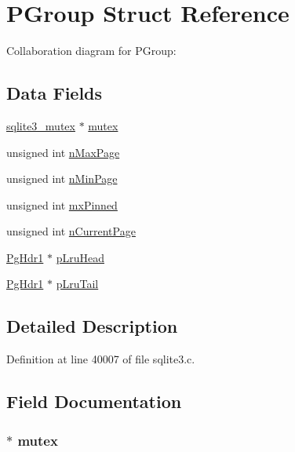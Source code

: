 \hypertarget{struct_p_group}{}\section{P\+Group Struct Reference}
\label{struct_p_group}


Collaboration diagram for P\+Group\+:
\subsection*{Data Fields}
\begin{DoxyCompactItemize}
\item 
\hyperlink{structsqlite3__mutex}{sqlite3\+\_\+mutex} $\ast$ \hyperlink{struct_p_group_a7bcdded0e06fa908fe1a6df19c3dda21}{mutex}
\item 
unsigned int \hyperlink{struct_p_group_ac568a58f73a459ed4cce98f058f91468}{n\+Max\+Page}
\item 
unsigned int \hyperlink{struct_p_group_a2c4b1aa5fcf28d3bf880b8bd5eac95c4}{n\+Min\+Page}
\item 
unsigned int \hyperlink{struct_p_group_a8c213ece02546a2177eb8f35830605e8}{mx\+Pinned}
\item 
unsigned int \hyperlink{struct_p_group_ac067428645a5c7caf1f90b61438fcaac}{n\+Current\+Page}
\item 
\hyperlink{struct_pg_hdr1}{Pg\+Hdr1} $\ast$ \hyperlink{struct_p_group_ac126ae8e5a7de715e31a5a56e306c1a5}{p\+Lru\+Head}
\item 
\hyperlink{struct_pg_hdr1}{Pg\+Hdr1} $\ast$ \hyperlink{struct_p_group_a9e9d430cf252bc6174d4bcb769eba892}{p\+Lru\+Tail}
\end{DoxyCompactItemize}


\subsection{Detailed Description}


Definition at line 40007 of file sqlite3.\+c.



\subsection{Field Documentation}
\hypertarget{struct_p_group_a7bcdded0e06fa908fe1a6df19c3dda21}{}
\subsubsection[{mutex}]{$\ast$ mutex}\label{struct_p_group_a7bcdded0e06fa908fe1a6df19c3dda21}


